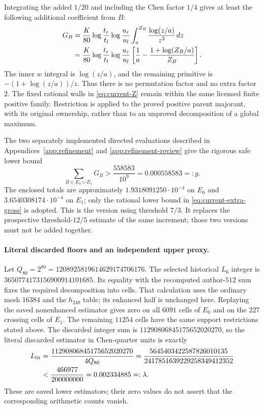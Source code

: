 Integrating the added $1/20$ and including the Chen factor $1/4$
gives at least the following additional coefficient from $B$:
\begin{align}
 G_B
 &=\frac{K}{80}
   \log\frac{t_r}{t_l}\log\frac{u_r}{u_l}
      \int_a^{Z_B}\frac{\log(z/a)}{z^2}\,dz \notag\\
 &=\frac{K}{80}
   \log\frac{t_r}{t_l}\log\frac{u_r}{u_l}
   \left[\frac1a-\frac{1+\log(Z_B/a)}{Z_B}\right].
 \label{eq:current-extra-fibre}
\end{align}
The inner $w$ integral is $\log(z/a)$, and the remaining primitive
is $-(1+\log(z/a))/z$.  Thus there is no permutation factor and
no extra factor $2$.  The fixed rational walls in
\eqref{eq:current-Z} remain within the same licensed finite
positive family.  Restriction is applied to the proved positive
parent majorant, with its original ownership, rather than to an
unproved decomposition of a global maximum.

The two separately implemented directed evaluations described in
Appendices~\ref{app:refinement} and \ref{app:refinement-review}
give the rigorous safe lower bound
\begin{equation}
 \sum_{B\in E_0\cup E_1}G_B
       >\frac{558583}{10^9}=0.000558583=:g.
 \label{eq:current-extra-gross}
\end{equation}
The enclosed totals are approximately $1.9318091250\cdot10^{-4}$
on $E_0$ and $3.6540308174\cdot10^{-4}$ on $E_1$; only the
rational lower bound in \eqref{eq:current-extra-gross} is adopted.
This is the version using threshold $7/3$.  It replaces the
prospective threshold-$12/5$ estimate of the same increment;
those two versions must not be added together.

\paragraph{Literal discarded floors and an independent upper proxy.}
Let $Q_{80}=2^{80}=1208925819614629174706176$.
The selected historical $L_6$ integer is
$3650774173156900914101685$.  Its equality with the recomputed
author-$512$ sum fixes the required decomposition into cells.
That calculation uses the ordinary mesh $16384$ and the $h_{248}$
table; its enhanced half is unchanged here.  Replaying the saved
nonenhanced estimator gives zero on all $6091$ cells of $E_0$
and on the $227$ crossing cells of $E_1$.  The remaining $11254$
cells have the same support restrictions stated above.  The
discarded integer sum is $11290806845175652020270$, so the
literal discarded estimator in Chen-quarter units is exactly
\begin{align}
 L_{\rm lit}
 &=\frac{11290806845175652020270}{4Q_{80}}
 =\frac{5645403422587826010135}{2417851639229258349412352}\notag\\
 &<\frac{466977}{200000000}=0.002334885=:\lambda.
 \label{eq:current-literal-loss}
\end{align}
These are saved lower estimators; their zero values do not assert
that the corresponding arithmetic counts vanish.

